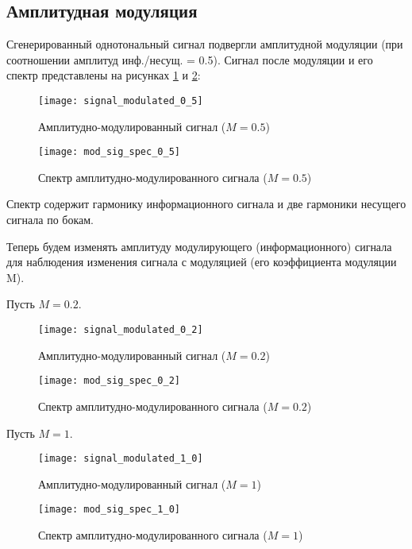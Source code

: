 \subsection{Амплитудная модуляция}
Сгенерированный однотональный сигнал подвергли амплитудной модуляции (при соотношении амплитуд инф./несущ. = 0.5). Сигнал после модуляции и его спектр представлены на рисунках \ref{pic:signal_modulated_0_5} и \ref{pic:mod_sig_spec_0_5}:
\begin{figure}[H]
	\begin{center}
		\texttt{[image: signal\_modulated\_0\_5]}
		\caption{Амплитудно-модулированный сигнал ($M = 0.5$)} 
		\label{pic:signal_modulated_0_5} %
	\end{center}
\end{figure}

\begin{figure}[H]
	\begin{center}
		\texttt{[image: mod\_sig\_spec\_0\_5]}
		\caption{Спектр амплитудно-модулированного сигнала ($M = 0.5$)} 
		\label{pic:mod_sig_spec_0_5} %
	\end{center}
\end{figure}
Спектр содержит гармонику информационного сигнала и две гармоники несущего сигнала по бокам.

Теперь будем изменять амплитуду модулирующего (информационного) сигнала для наблюдения изменения сигнала с модуляцией (его коэффициента модуляции M).

Пусть $M = 0.2$.
\begin{figure}[H]
	\begin{center}
		\texttt{[image: signal\_modulated\_0\_2]}
		\caption{Амплитудно-модулированный сигнал ($M = 0.2$)} 
		\label{pic:signal_modulated_0_2} %
	\end{center}
\end{figure}
\begin{figure}[H]
	\begin{center}
		\texttt{[image: mod\_sig\_spec\_0\_2]}
		\caption{Спектр амплитудно-модулированного сигнала ($M = 0.2$)} 
		\label{pic:mod_sig_spec_0_2} %
	\end{center}
\end{figure}

Пусть $M = 1$.
\begin{figure}[H]
	\begin{center}
		\texttt{[image: signal\_modulated\_1\_0]}
		\caption{Амплитудно-модулированный сигнал ($M = 1$)} 
		\label{pic:signal_modulated_1_0} %
	\end{center}
\end{figure}
\begin{figure}[H]
	\begin{center}
		\texttt{[image: mod\_sig\_spec\_1\_0]}
		\caption{Спектр амплитудно-модулированного сигнала ($M = 1$)} 
		\label{pic:mod_sig_spec_1_0} %
	\end{center}
\end{figure}

